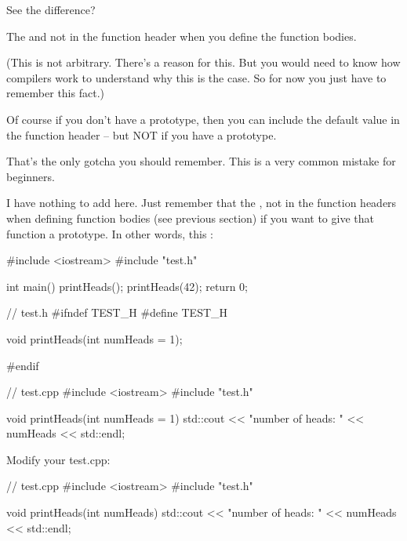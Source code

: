 See the difference?

The  and not in the function header when you define the function bodies.

(This is not arbitrary. There's a reason for this. But you would need to know how compilers work to understand why this is the case. So for now you just have to remember this fact.)

Of course if you don't have a prototype, then you can include the default value in the function header -- but NOT if you have a prototype.

That's the only gotcha you should remember. This is a very common mistake for beginners.


\newpage{}

I have nothing to add here. Just remember that the , not in the function headers when defining function bodies (see previous section) if you want to give that function a prototype. In other words, this :

\begin{consolethree}[escapeinside=||]
#include <iostream>
#include "test.h"

int main()
{
    printHeads();
    printHeads(42);
    return 0;
}
\end{consolethree}

\begin{consolethree}[escapeinside=||]
// test.h
#ifndef TEST_H
#define TEST_H

void printHeads(int numHeads = 1);

#endif
\end{consolethree}

\begin{consolethree}[escapeinside=||]
// test.cpp
#include <iostream>
#include "test.h"

void printHeads(int numHeads = 1)
{
    std::cout << "number of heads: " << numHeads
              << std::endl;
}
\end{consolethree}

Modify your test.cpp:

\begin{consolethree}[escapeinside=||]
// test.cpp
#include <iostream>
#include "test.h"

void printHeads(int numHeads)
{
    std::cout << "number of heads: " << numHeads
              << std::endl;
}
\end{consolethree}

